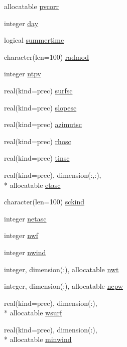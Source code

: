 \begin{DoxyCompactItemize}
allocatable \hyperlink{classinputvar_aaa751e7b478966be1287687d4899ca3f}{pvcorr}
\item 
integer \hyperlink{classinputvar_af0f2faabf3f021accc56491cdcf43db5}{day}
\item 
logical \hyperlink{classinputvar_aec499a973401b90a01f106d089b0e982}{summertime}
\item 
character(len=100) \hyperlink{classinputvar_a45e665d3fff6479724af6fcb9819f779}{radmod}
\item 
integer \hyperlink{classinputvar_a7aec6c8c1bc131db50a1a7e65f8b0977}{ntpv}
\item 
real(kind=prec) \hyperlink{classinputvar_a8a591d3ec84f2b1c645a06110935e7cd}{surfsc}
\item 
real(kind=prec) \hyperlink{classinputvar_a38a21450f63b87e2e09c5c4eedd3e6ef}{slopesc}
\item 
real(kind=prec) \hyperlink{classinputvar_a55e23291eb7d5495b50199caabe3e529}{azimutsc}
\item 
real(kind=prec) \hyperlink{classinputvar_aac32027dc5d095e6dcb9088dec220274}{rhosc}
\item 
real(kind=prec) \hyperlink{classinputvar_a3c4fd3f3b8a4ef86969e1e9eec3338c8}{tinsc}
\item 
real(kind=prec), dimension(\-:,\-:), \\*
allocatable \hyperlink{classinputvar_abf4e2424b8bd9e57417fa35d19c20a2d}{etasc}
\item 
character(len=100) \hyperlink{classinputvar_a1690adffbcaeb3cbd73051d411d2a376}{sckind}
\item 
integer \hyperlink{classinputvar_a803bd9bf1eb3b3aaa4e498bbad5c89c9}{netasc}
\item 
integer \hyperlink{classinputvar_a1da1d97ed067b07a4a7717bffd2552ee}{nwf}
\item 
integer \hyperlink{classinputvar_a02de598dd9d979229fdb815b3fbfcd04}{nwind}
\item 
integer, dimension(\-:), allocatable \hyperlink{classinputvar_a33759b5d3ac0ed8e83e2a56028668bc5}{nwt}
\item 
integer, dimension(\-:), allocatable \hyperlink{classinputvar_a58640e3824c5fa77d6d108cf97b7a0bc}{ncpw}
\item 
real(kind=prec), dimension(\-:), \\*
allocatable \hyperlink{classinputvar_a14476d610b1d64d08f3681482a8e82b8}{wsurf}
\item 
real(kind=prec), dimension(\-:), \\*
allocatable \hyperlink{classinputvar_abb9cb8ca38b7592b52f30836a6755584}{minwind}

\end{DoxyCompactItemize}
